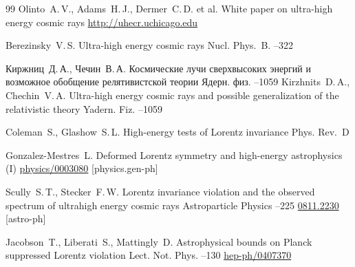 \begin{thebibliography}{99}
\by Olinto~A.\,V., Adams~H.\,J., Dermer~C.\,D. et al.
\preprint White paper on ultra-high energy cosmic rays
\preprintinfo \url{http://uhecr.uchicago.edu}


\by Berezinsky~V.\,S.
\paper Ultra-high energy cosmic rays
\jour Nucl. Phys.~B.
--322

\by Киржниц~Д.\,А., Чечин~В.\,А.
\paper Космические лучи сверхвысоких энергий и возможное обобщение релятивистской теории
\jour Ядерн. физ.
--1059
\misctransl
\by Kirzhnits~D.\,A., Chechin~V.\,A.
\paper Ultra-high energy cosmic rays and possible generalization of the relativistic theory
\jour Yadern. Fiz.
--1059

\by Coleman~S., Glashow~S.\,L.
\paper High-energy tests of Lorentz invariance
\jour Phys. Rev.~D


\by Gonzalez-Mestres~L.
\preprint Deformed Lorentz symmetry and high-energy astrophysics (I)
\arxiv 	\href{http://arxiv.org/abs/physics/0003080}{physics/0003080} [physics.gen-ph]

\by Scully~S.\,T., Stecker~F.\,W.
\paper Lorentz invariance violation and the observed spectrum of ultrahigh energy cosmic rays 
\jour Astroparticle Physics
--225 
\arxiv 	\href{http://arxiv.org/abs/0811.2230}{0811.2230} [astro-ph]


\by Jacobson~T., Liberati~S., Mattingly~D.
\paper Astrophysical bounds on Planck suppressed Lorentz violation
\jour Lect. Not. Phys.
--130
\arxiv 	\href{http://arxiv.org/abs/hep-ph/0407370}{hep-ph/0407370}

\end{thebibliography}



\makeengtitlem

\newpage

%
